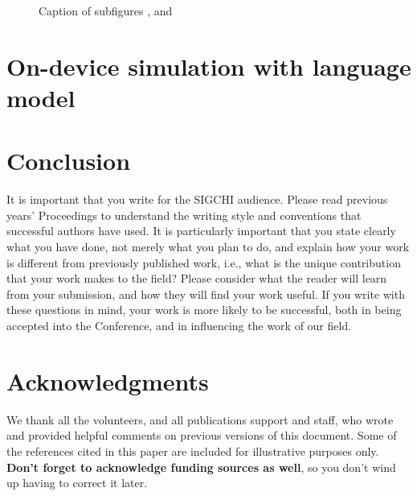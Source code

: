 \documentclass{sigchi}
\begin{document}
\begin{figure}[tb]
{    \label{fig:subfig3}
	}
	\caption[Optional caption for list of figures]{Caption of subfigures
	,  and }
	\label{fig:subfigureExample}
\end{figure}

\section{On-device simulation with language model}

\section{Conclusion}

It is important that you write for the SIGCHI audience.  Please read
previous years' Proceedings to understand the writing style and
conventions that successful authors have used.  It is particularly
important that you state clearly what you have done, not merely what
you plan to do, and explain how your work is different from previously
published work, i.e., what is the unique contribution that your work
makes to the field?  Please consider what the reader will learn from
your submission, and how they will find your work useful.  If you
write with these questions in mind, your work is more likely to be
successful, both in being accepted into the Conference, and in
influencing the work of our field.

\section{Acknowledgments}

We thank all the volunteers, and all publications support
and staff, who wrote and provided helpful comments on previous
versions of this document.  Some of the references cited in this paper
are included for illustrative purposes only.  \textbf{Don't forget
to acknowledge funding sources as well}, so you don't wind up
having to correct it later.

%
%
%
%
%
\balance



\end{document}
